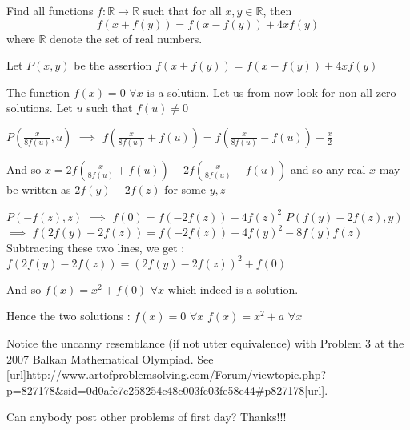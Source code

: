 \begin{solution}
	\begin{tcolorbox}Find all functions $f:\mathbb{R}\rightarrow\mathbb{R}$ such that for all $x,y\in\mathbb{R}$, then
\[f(x+f(y))=f(x-f(y))+4xf(y)\]
where $\mathbb{R}$ denote the set of real numbers.\end{tcolorbox}
Let $P(x,y)$ be the assertion $f(x+f(y))=f(x-f(y))+4xf(y)$

The function $f(x)=0$ $\forall x$ is a solution. Let us from now look for non all zero solutions.
Let $u$ such that $f(u)\ne 0$

$P(\frac x{8f(u)},u)$ $\implies$ $f(\frac x{8f(u)}+f(u))=f(\frac x{8f(u)}-f(u))+\frac x2$

And so $x=2f(\frac x{8f(u)}+f(u))-2f(\frac x{8f(u)}-f(u))$ and so any real $x$ may be written as $2f(y)-2f(z)$ for some $y,z$

$P(-f(z),z)$ $\implies$ $f(0)=f(-2f(z))-4f(z)^2$
$P(f(y)-2f(z),y)$ $\implies$ $f(2f(y)-2f(z))=f(-2f(z))+4f(y)^2-8f(y)f(z)$
Subtracting these two lines, we get : $f(2f(y)-2f(z))=(2f(y)-2f(z))^2+f(0)$

And so $f(x)=x^2+f(0)$ $\forall x$ which indeed is a solution.

Hence the two solutions :
$f(x)=0$ $\forall x$
$f(x)=x^2+a$ $\forall x$
\end{solution}



\begin{solution}
	Notice the uncanny resemblance (if not utter equivalence) with Problem 3 at the 2007 Balkan Mathematical Olympiad.
See [url]http://www.artofproblemsolving.com/Forum/viewtopic.php?p=827178&sid=0d0afe7c258254c48c003fe03fe58e44#p827178[\/url].
\end{solution}



\begin{solution}
	Can anybody post other problems of first day?
Thanks!!!
\end{solution}



